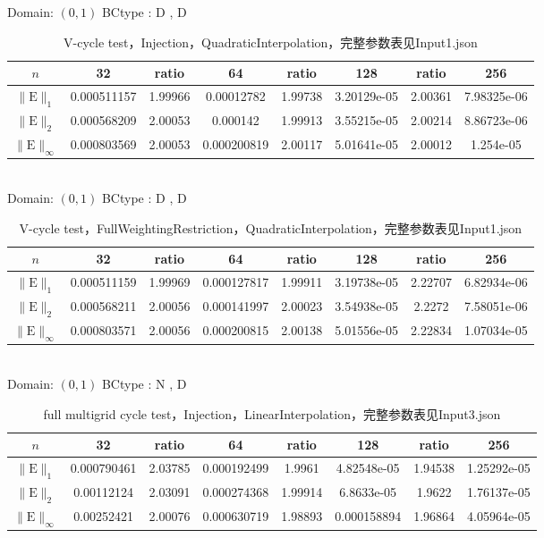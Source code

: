 \documentclass[a4paper,twoside]{ctexart}
\begin{document}
\noindent Domain: $(0,1)$
BCtype : D , D
\begin{table}[htbp]
\centering\begin{tabular}{c|ccccccc}
\hline
$n$&32&ratio&64&ratio&128&ratio&256\\
\hline
$\|\mathrm{E}\|_1$&0.000511157&1.99966&0.00012782&1.99738&3.20129e-05&2.00361&7.98325e-06\\
\hline
$\|\mathrm{E}\|_2$&0.000568209&2.00053&0.000142&1.99913&3.55215e-05&2.00214&8.86723e-06\\
\hline
$\|\mathrm{E}\|_{\infty}$&0.000803569&2.00053&0.000200819&2.00117&5.01641e-05&2.00012&1.254e-05\\
\hline
\end{tabular}
\caption{V-cycle test，Injection，QuadraticInterpolation，完整参数表见Input1.json}
\end{table}\\

\noindent Domain: $(0,1)$
BCtype : D , D
\begin{table}[htbp]
\centering\begin{tabular}{c|ccccccc}
\hline
$n$&32&ratio&64&ratio&128&ratio&256\\
\hline
$\|\mathrm{E}\|_1$&0.000511159&1.99969&0.000127817&1.99911&3.19738e-05&2.22707&6.82934e-06\\
\hline
$\|\mathrm{E}\|_2$&0.000568211&2.00056&0.000141997&2.00023&3.54938e-05&2.2272&7.58051e-06\\
\hline
$\|\mathrm{E}\|_{\infty}$&0.000803571&2.00056&0.000200815&2.00138&5.01556e-05&2.22834&1.07034e-05\\
\hline
\end{tabular}
\caption{V-cycle test，FullWeightingRestriction，QuadraticInterpolation，完整参数表见Input1.json}
\end{table}\\

\noindent Domain: $(0,1)$
BCtype : N , D
\begin{table}[htbp]
\centering\begin{tabular}{c|ccccccc}
\hline
$n$&32&ratio&64&ratio&128&ratio&256\\
\hline
$\|\mathrm{E}\|_1$&0.000790461&2.03785&0.000192499&1.9961&4.82548e-05&1.94538&1.25292e-05\\
\hline
$\|\mathrm{E}\|_2$&0.00112124&2.03091&0.000274368&1.99914&6.8633e-05&1.9622&1.76137e-05\\
\hline
$\|\mathrm{E}\|_{\infty}$&0.00252421&2.00076&0.000630719&1.98893&0.000158894&1.96864&4.05964e-05\\
\hline
\end{tabular}
\caption{full multigrid cycle test，Injection，LinearInterpolation，完整参数表见Input3.json}
\end{table}\\
\end{document}
